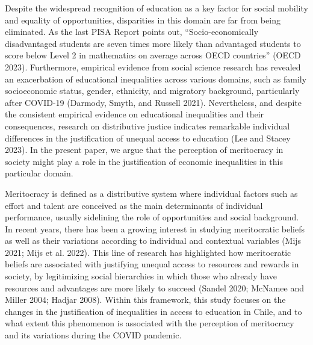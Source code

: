 \documentclass[
]{article}
\begin{document}
Despite the widespread recognition of education as a key factor for
social mobility and equality of opportunities, disparities in this
domain are far from being eliminated. As the last PISA Report points
out, ``Socio-economically disadvantaged students are seven times more
likely than advantaged students to score below Level 2 in mathematics on
average across OECD countries'' (OECD 2023). Furthermore, empirical
evidence from social science research has revealed an exacerbation of
educational inequalities across various domains, such as family
socioeconomic status, gender, ethnicity, and migratory background,
particularly after COVID-19 (Darmody, Smyth, and Russell 2021).
Nevertheless, and despite the consistent empirical evidence on
educational inequalities and their consequences, research on
distributive justice indicates remarkable individual differences in the
justification of unequal access to education (Lee and Stacey 2023). In
the present paper, we argue that the perception of meritocracy in
society might play a role in the justification of economic inequalities
in this particular domain.

Meritocracy is defined as a distributive system where individual factors
such as effort and talent are conceived as the main determinants of
individual performance, usually sidelining the role of opportunities and
social background. In recent years, there has been a growing interest in
studying meritocratic beliefs as well as their variations according to
individual and contextual variables (Mijs 2021; Mijs et al. 2022). This
line of research has highlighted how meritocratic beliefs are associated
with justifying unequal access to resources and rewards in society, by
legitimizing social hierarchies in which those who already have
resources and advantages are more likely to succeed (Sandel 2020;
McNamee and Miller 2004; Hadjar 2008). Within this framework, this study
focuses on the changes in the justification of inequalities in access to
education in Chile, and to what extent this phenomenon is associated
with the perception of meritocracy and its variations during the COVID
pandemic.
\end{document}
